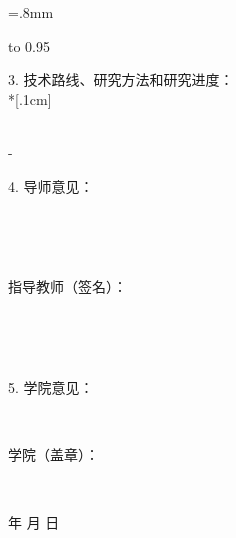 \extrarowsep=.8mm

\begin{tabu}to 0.95\linewidth{|X[c]|}\hline
	\parbox[t][11.6cm][t]{14.6cm}{
		3. 技术路线、研究方法和研究进度：\\*[.1cm]\fangsong
		\luxian
	}\\\tabucline-
	\parbox[t][.5cm][t]{14.6cm}{
		4. 导师意见：
	}\\
	\parbox[t][3.5cm][c]{14.6cm}{
		\centering {\fangsong\Kcomments}
}\\
\parbox[t][.6cm][t]{14.6cm}{
	\hspace{7cm}指导教师（签名）：{}
}\\
\parbox[t][.6cm][t]{14.6cm}{
	\hspace{10cm} \kaitiriqi
}\\\hline
\parbox[t][3cm][t]{14.6cm}{
	5. 学院意见：
}\\
\parbox[t][.6cm][t]{14.6cm}{
	\hspace{8cm}学院（盖章）：
}\\
\parbox[t][.6cm][t]{14.6cm}{
	\hspace{11cm}年\hspace{.5cm} 月\hspace{.5cm} 日
}\\\hline
\end{tabu}
